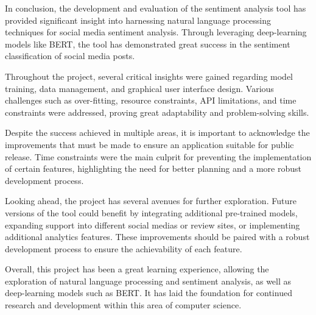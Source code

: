 In conclusion, the development and evaluation of the sentiment analysis tool has provided significant insight into harnessing natural language processing techniques for social media sentiment analysis. Through leveraging deep-learning models like BERT, the tool has demonstrated great success in the sentiment classification of social media posts.

Throughout the project, several critical insights were gained regarding model training, data management, and graphical user interface design. Various challenges such as over-fitting, resource constraints, API limitations, and time constraints were addressed, proving great adaptability and problem-solving skills.

Despite the success achieved in multiple areas, it is important to acknowledge the improvements that must be made to ensure an application suitable for public release. Time constraints were the main culprit for preventing the implementation of certain features, highlighting the need for better planning and a more robust development process.

Looking ahead, the project has several avenues for further exploration. Future versions of the tool could benefit by integrating additional pre-trained models, expanding support into different social medias or review sites, or implementing additional analytics features. These improvements should be paired with a robust development process to ensure the achievability of each feature.

Overall, this project has been a great learning experience, allowing the exploration of natural language processing and sentiment analysis, as well as deep-learning models such as BERT. It has laid the foundation for continued research and development within this area of computer science.